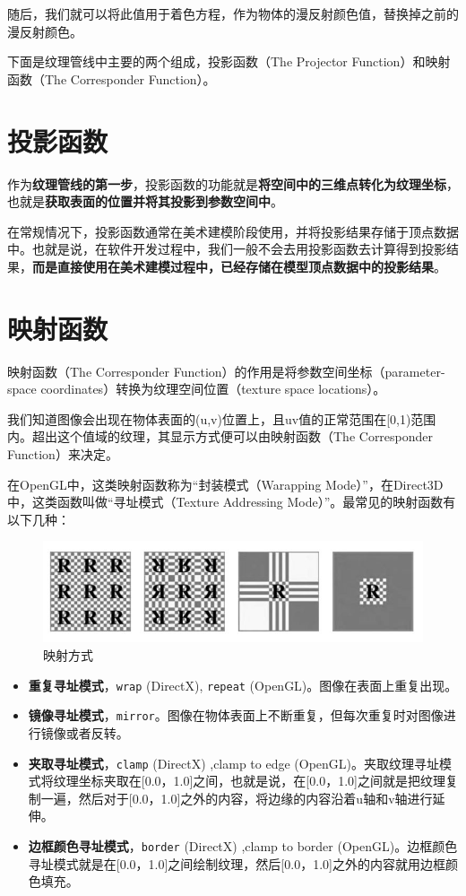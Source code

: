 \documentclass[UTF8,a4paper,12pt]{ctexbook}
\begin{document}
		随后，我们就可以将此值用于着色方程，作为物体的漫反射颜色值，替换掉之前的漫反射颜色。
		
		下面是纹理管线中主要的两个组成，投影函数（The Projector Function）和映射函数（The Corresponder Function）。
			
	\section{投影函数}
		作为\textbf{纹理管线的第一步}，投影函数的功能就是\textbf{将空间中的三维点转化为纹理坐标}，也就是\textbf{获取表面的位置并将其投影到参数空间中}。
		
		在常规情况下，投影函数通常在美术建模阶段使用，并将投影结果存储于顶点数据中。也就是说，在软件开发过程中，我们一般不会去用投影函数去计算得到投影结果，\textbf{而是直接使用在美术建模过程中，已经存储在模型顶点数据中的投影结果}。
		
	\section{映射函数}
		映射函数（The Corresponder Function）的作用是将参数空间坐标（parameter-space coordinates）转换为纹理空间位置（texture space locations）。
		
		我们知道图像会出现在物体表面的(u,v)位置上，且uv值的正常范围在[0,1)范围内。超出这个值域的纹理，其显示方式便可以由映射函数（The Corresponder Function）来决定。
		
		在OpenGL中，这类映射函数称为“封装模式（Warapping Mode）”，在Direct3D中，这类函数叫做“寻址模式（Texture Addressing Mode）”。最常见的映射函数有以下几种：
			
			\begin{figure}[H]
				\centering
				\includegraphics[scale=0.57]{Mapping}
				\caption{映射方式}
			\end{figure}
			
			\begin{itemize}
				\item \textbf{重复寻址模式}，\verb|wrap| (DirectX), \verb|repeat| (OpenGL)。图像在表面上重复出现。
				\item \textbf{镜像寻址模式}，\verb|mirror|。图像在物体表面上不断重复，但每次重复时对图像进行镜像或者反转。
				\item \textbf{夹取寻址模式}，\verb|clamp| (DirectX) ,clamp to edge (OpenGL)。夹取纹理寻址模式将纹理坐标夹取在[0.0，1.0]之间，也就是说，在[0.0，1.0]之间就是把纹理复制一遍，然后对于[0.0，1.0]之外的内容，将边缘的内容沿着u轴和v轴进行延伸。
				\item \textbf{边框颜色寻址模式}，\verb|border| (DirectX) ,clamp to border (OpenGL)。边框颜色寻址模式就是在[0.0，1.0]之间绘制纹理，然后[0.0，1.0]之外的内容就用边框颜色填充。		
			\end{itemize}
\end{document}
